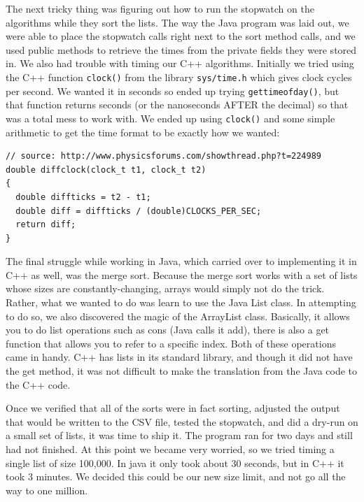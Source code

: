 \documentclass[12pt]{amsart}
\begin{document}
The next tricky thing was figuring out how to run the stopwatch on the 
algorithms while they sort the lists. The way the Java program was laid out, we were able to place the stopwatch calls right next to the sort method calls, and we used public methods to retrieve the times from the private fields they were stored in. We also had trouble with timing our C++ algorithms. Initially we tried using the C++ function \texttt{clock()} from the library \texttt{sys/time.h} which gives clock cycles per second. We wanted it in seconds so ended up trying \texttt{gettimeofday()}, but that function returns seconds (or the nanoseconds AFTER the decimal) so that was a total mess to work with. We ended up using \texttt{clock()} and some simple arithmetic to get the time format to be exactly how we wanted:
\linespread{1}
\begin{verbatim}
// source: http://www.physicsforums.com/showthread.php?t=224989
double diffclock(clock_t t1, clock_t t2)
{
  double diffticks = t2 - t1;
  double diff = diffticks / (double)CLOCKS_PER_SEC;
  return diff;
}
\end{verbatim}
\linespread{1.5}
The final struggle while working in Java, which carried over to implementing it
in C++ as well, was the merge sort. Because the merge sort works with a set of
lists whose sizes are constantly-changing, arrays would simply not do the trick.
Rather, what we wanted to do was learn to use the Java List class. In attempting
to do so, we also discovered the magic of the ArrayList class. Basically, it
allows you to do list operations such as cons (Java calls it add), there is also
a get function that allows you to refer to a specific index. Both of these
operations came in handy. C++ has lists in its standard library, and though it
did not have the get method, it was not difficult to make the translation from
the Java code to the C++ code.

Once we verified that all of the sorts were in fact sorting, adjusted the output
that would be written to the CSV file, tested the stopwatch, and did a dry-run
on a small set of lists, it was time to ship it. The program ran for two days
and still had not finished. At this point we became very worried, so we tried
timing a single list of size 100,000. In java it only took about 30 seconds, but
in C++ it took 3 minutes. We decided this could be our new size limit, and not
go all the way to one million.
\end{document}
